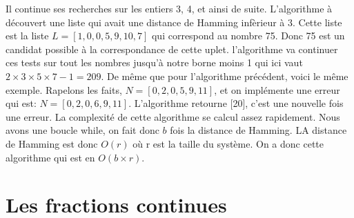 \documentclass[a4paper, 11pt]{report}
\begin{document}
Il continue ses recherches sur les entiers 3, 4, et ainsi de suite. L'algorithme à découvert une liste qui avait une distance de Hamming infèrieur à 3. Cette liste est la liste $L=[1,0,0,5,9,10,7]$ qui correspond au nombre 75. Donc 75 est un candidat possible à la correspondance de cette uplet.
l'algorithme va continuer ces tests sur tout les nombres jusqu'à notre borne moins 1 qui ici vaut $2\times 3\times 5\times 7 -1=209$. \newline
\newline
De même que pour l'algorithme précédent, voici le même exemple. \newline
Rapelons les faits, $N=[0, 2, 0, 5, 9, 11]$, et on implémente une erreur qui est: $N=[0, 2, 0, 6, 9, 11]$.
L'algorithme retourne [20], c'est une nouvelle fois une erreur.
\newline
La complexité de cette algorithme se calcul assez rapidement. Nous avons une boucle while, on fait donc $b$ fois la distance de Hamming. LA distance de Hamming est donc $O(r)$ où r est la taille du système. On a donc cette algorithme 
qui est en $O(b\times r)$.




\newpage
\chapter{Les fractions continues} 
\end{document}
